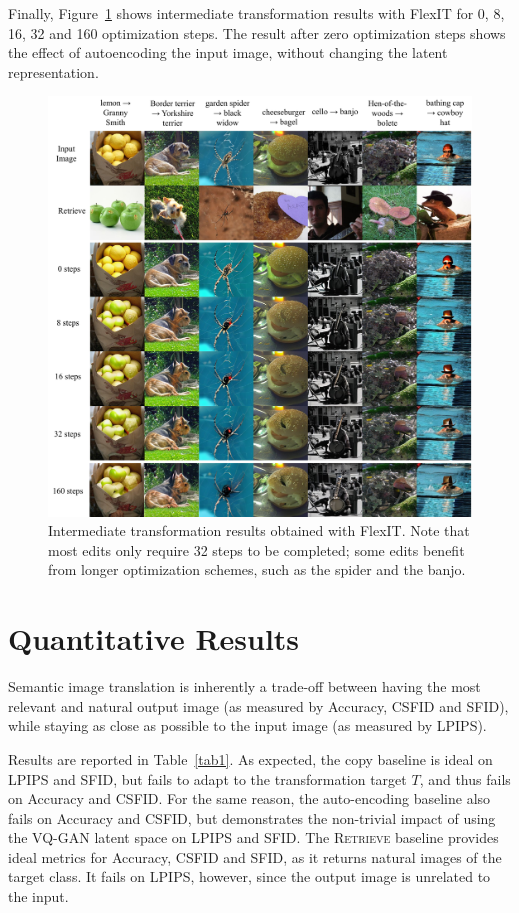 Finally, Figure~\ref{fig:steps} shows intermediate transformation results with FlexIT for 0, 8, 16, 32 and 160 optimization steps. 
The result after zero optimization steps shows the effect of autoencoding the input image, without changing the latent representation.

\begin{figure}[h!]
    \center
    \includegraphics[width=\linewidth]{images/flexit/assets/steps.pdf}
    \caption{Intermediate transformation results obtained with FlexIT. Note that most edits only require 32 steps to be completed; some edits benefit from longer optimization schemes, such as the  spider and the banjo.
    }
    \label{fig:steps}
\end{figure}

\section{Quantitative Results}

Semantic image translation is inherently a trade-off between having the most relevant 
and natural output image (as measured by Accuracy, \ac{CSFID} and \ac{SFID}), while staying as 
close as possible to the input image (as measured by \ac{LPIPS}). 

Results are reported in Table~\ref{tab1}. 
As expected, the copy baseline is ideal on \ac{LPIPS} and \ac{SFID}, but fails to adapt to the 
transformation target $T$, and thus fails on Accuracy and \ac{CSFID}.
For the same reason, the auto-encoding baseline also fails on Accuracy and \ac{CSFID}, but 
demonstrates the non-trivial impact of using the VQ-GAN latent space on \ac{LPIPS} and \ac{SFID}. 
The \textsc{Retrieve} baseline provides ideal metrics for Accuracy, \ac{CSFID} and \ac{SFID}, as 
it returns natural images of the target class. 
It fails  on \ac{LPIPS}, however, since the output image is unrelated to the input. 



